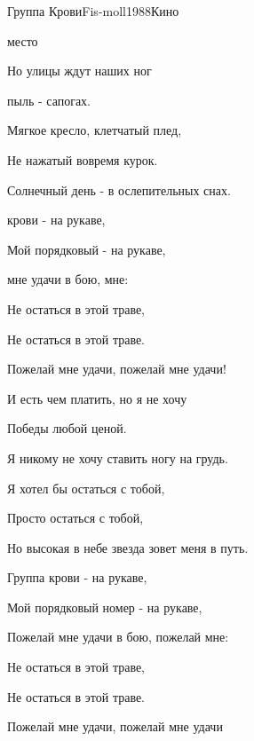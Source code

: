 \begin{song}{Группа Крови}{Fis-moll}{1988}{Кино}{}{}

  \begin{SBVerse}
     место

    Но улицы ждут  наших ног

     пыль -  сапогах.

    Мягкое кресло, клетчатый плед,

    Не нажатый вовремя курок.

    Солнечный день - в ослепительных снах.
  \end{SBVerse}

  \begin{SBChorus}
     крови - на рукаве,

    Мой порядковый  - на рукаве,

     мне удачи в бою,  мне:

    Не остаться в этой траве,

    Не остаться в этой траве.

    Пожелай мне удачи, пожелай мне удачи!
  \end{SBChorus}

  \begin{SBVerse}
    И есть чем платить, но я не хочу

    Победы любой ценой.

    Я никому не хочу ставить ногу на грудь.

    Я хотел бы остаться с тобой,

    Просто остаться с тобой,

    Но высокая в небе звезда зовет меня в путь.
  \end{SBVerse}

  \begin{SBChorus}
    Группа крови - на рукаве,

    Мой порядковый номер - на рукаве,

    Пожелай мне удачи в бою, пожелай мне:

    Не остаться в этой траве,

    Не остаться в этой траве.

    Пожелай мне удачи, пожелай мне удачи
  \end{SBChorus}
\end{song}
